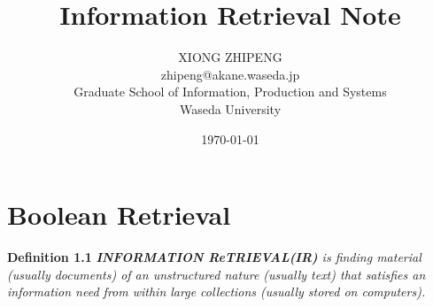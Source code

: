\documentclass[a4paper]{book}
\title{Information Retrieval Note}
\author{XIONG ZHIPENG\\ \small zhipeng@akane.waseda.jp\\
Graduate School of Information, Production and Systems\\Waseda University}
\date{\today}
\begin{document}
\maketitle
\tableofcontents


\chapter{Boolean Retrieval}
\textbf{Definition 1.1} 
\textit{\textbf{INFORMATION ReTRIEVAL(IR)} is finding material (usually documents) of an unstructured nature (usually text) that satisfies an information need from within large collections (usually stored on computers).\\}
\end{document}
